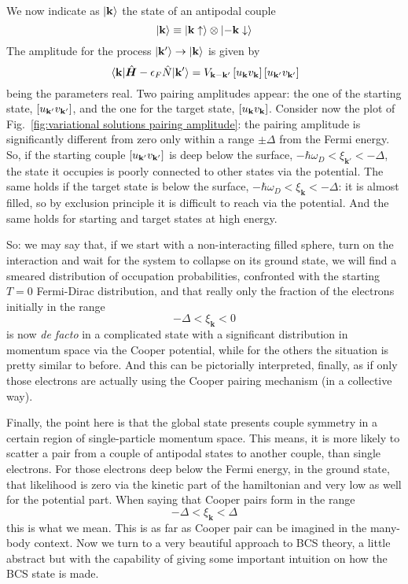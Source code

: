 We now indicate as $\ket{\mathbf{k}}$ the state of an antipodal couple
\[
	\ket{\mathbf{k}} \equiv \ket{\mathbf{k}\uparrow} \otimes \ket{-\mathbf{k}\downarrow}
\]
The amplitude for the process $\ket{\mathbf{k}'} \to \ket{\mathbf{k}}$ is given by
\[
	\mel{\mathbf{k}}{\hat{\bm H} - \epsilon_F \hat{N}}{\mathbf{k}'} = V_{\mathbf{k}-\mathbf{k}'} \left[{u_\mathbf{k} v_\mathbf{k}}\right] \left[{u_{\mathbf{k}'} v_{\mathbf{k}'}}\right]
\]
being the parameters real. Two pairing amplitudes appear: the one of the starting state, $\left[{u_{\mathbf{k}'} v_{\mathbf{k}'}}\right]$, and the one for the target state, $\left[{u_\mathbf{k} v_\mathbf{k}}\right]$. Consider now the plot of Fig.~\ref{fig:variational solutions pairing amplitude}: the pairing amplitude is significantly different from zero only within a range $\pm\Delta$ from the Fermi energy. So, if the starting couple $\left[{u_{\mathbf{k}'} v_{\mathbf{k}'}}\right]$ is deep below the surface, $-\hbar\omega_D < \xi_{\mathbf{k}'} < -\Delta$, the state it occupies is poorly connected to other states via the potential. The same holds if the target state is below the surface, $-\hbar\omega_D < \xi_\mathbf{k} < -\Delta$: it is almost filled, so by exclusion principle it is difficult to reach via the potential. And the same holds for starting and target states at high energy.

So: we may say that, if we start with a non-interacting filled sphere, turn on the interaction and wait for the system to collapse on its ground state, we will find a smeared distribution of occupation probabilities, confronted with the starting $T=0$ Fermi-Dirac distribution, and that really only the fraction of the electrons initially in the range
\[
	- \Delta < \xi_\mathbf{k} < 0
\]
is now \textit{de facto} in a complicated state with a significant distribution in momentum space via the Cooper potential, while for the others the situation is pretty similar to before. And this can be pictorially interpreted, finally, as if only those electrons are actually using the Cooper pairing mechanism (in a collective way).

Finally, the point here is that the global state presents couple symmetry in a certain region of single-particle momentum space. This means, it is more likely to scatter a pair from a couple of antipodal states to another couple, than single electrons. For those electrons deep below the Fermi energy, in the ground state, that likelihood is zero via the kinetic part of the hamiltonian and very low as well for the potential part. When saying that Cooper pairs form in the range
\[
	- \Delta < \xi_\mathbf{k} < \Delta
\]
this is what we mean. This is as far as Cooper pair can be imagined in the many-body context. Now we turn to a very beautiful approach to BCS theory, a little abstract but with the capability of giving some important intuition on how the BCS state is made.

